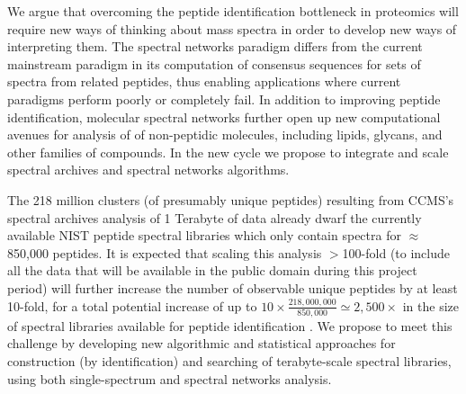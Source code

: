 \documentclass[arial,11pt]{article}
\begin{document}
We argue that overcoming the peptide identification bottleneck in proteomics
will require new ways of thinking about  mass spectra in order to develop new ways of interpreting them. The spectral networks paradigm differs from the current mainstream paradigm in its  computation of consensus sequences for sets of spectra from related peptides, thus enabling applications where current paradigms perform poorly or completely fail.
In addition to improving peptide identification, molecular spectral networks further open up new computational avenues for analysis of
of non-peptidic molecules, including
lipids, glycans, and other families of compounds. In the new cycle we propose to integrate and  scale spectral archives and spectral networks algorithms.

The 218 million clusters (of presumably unique peptides) resulting from CCMS's spectral archives analysis of 1 Terabyte of data already dwarf the currently available NIST peptide spectral libraries which only contain spectra for $\approx$850,000 peptides. It is expected that scaling this analysis $>$100-fold (to include all the data that will be available in the public domain during this project period)
 will further increase the number of observable unique peptides by at least 10-fold, for a total potential increase of up to $10\times\frac{218,000,000}{850,000}\simeq 2,500\times$ in the size of spectral libraries available for peptide identification . We propose to meet this challenge by developing new algorithmic and statistical approaches for construction (by identification) and searching of terabyte-scale spectral libraries, using both single-spectrum and spectral networks analysis.
\end{document}
